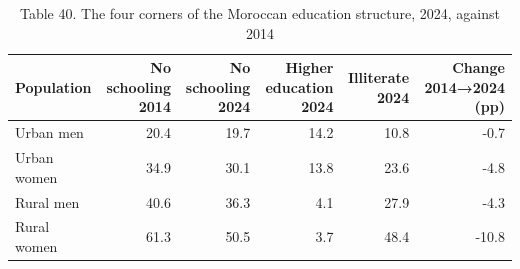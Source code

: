 \begin{table}
\caption{Table 40. The four corners of the Moroccan education structure, 2024, against 2014}
\label{tab:T40_four_corners_2024}
\begin{tabular}{lrrrrr}
\toprule
Population & No schooling 2014 & No schooling 2024 & Higher education 2024 & Illiterate 2024 & Change 2014→2024 (pp) \\
\midrule
Urban men & 20.4 & 19.7 & 14.2 & 10.8 & -0.7 \\
Urban women & 34.9 & 30.1 & 13.8 & 23.6 & -4.8 \\
Rural men & 40.6 & 36.3 & 4.1 & 27.9 & -4.3 \\
Rural women & 61.3 & 50.5 & 3.7 & 48.4 & -10.8 \\
\bottomrule
\end{tabular}
\end{table}
